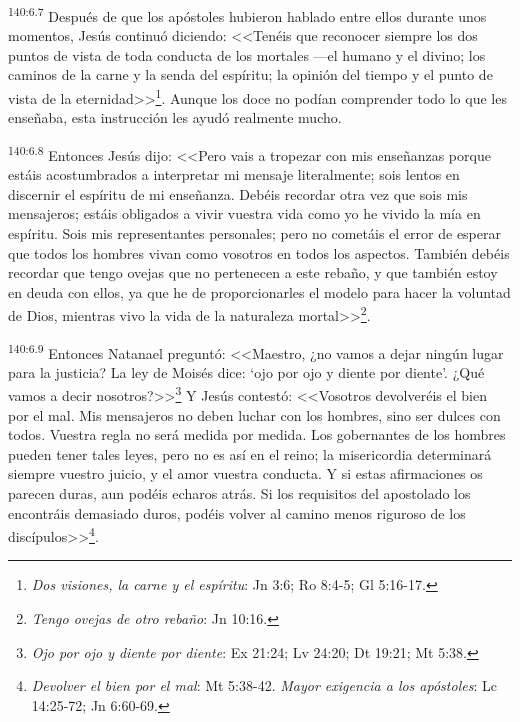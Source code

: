 \par 
\textsuperscript{140:6.7} Después de que los apóstoles hubieron hablado entre ellos durante unos momentos, Jesús continuó diciendo: <<Tenéis que reconocer siempre los dos puntos de vista de toda conducta de los mortales ---el humano y el divino; los caminos de la carne y la senda del espíritu; la opinión del tiempo y el punto de vista de la eternidad>>\footnote{\textit{Dos visiones, la carne y el espíritu}: Jn 3:6; Ro 8:4-5; Gl 5:16-17.}. Aunque los doce no podían comprender todo lo que les enseñaba, esta instrucción les ayudó realmente mucho.

\par 
\textsuperscript{140:6.8} Entonces Jesús dijo: <<Pero vais a tropezar con mis enseñanzas porque estáis acostumbrados a interpretar mi mensaje literalmente; sois lentos en discernir el espíritu de mi enseñanza. Debéis recordar otra vez que sois mis mensajeros; estáis obligados a vivir vuestra vida como yo he vivido la mía en espíritu. Sois mis representantes personales; pero no cometáis el error de esperar que todos los hombres vivan como vosotros en todos los aspectos. También debéis recordar que tengo ovejas que no pertenecen a este rebaño, y que también estoy en deuda con ellos, ya que he de proporcionarles el modelo para hacer la voluntad de Dios, mientras vivo la vida de la naturaleza mortal>>\footnote{\textit{Tengo ovejas de otro rebaño}: Jn 10:16.}.

\par 
\textsuperscript{140:6.9} Entonces Natanael preguntó: <<Maestro, ¿no vamos a dejar ningún lugar para la justicia? La ley de Moisés dice: `ojo por ojo y diente por diente'. ¿Qué vamos a decir nosotros?>>\footnote{\textit{Ojo por ojo y diente por diente}: Ex 21:24; Lv 24:20; Dt 19:21; Mt 5:38.} Y Jesús contestó: <<Vosotros devolveréis el bien por el mal. Mis mensajeros no deben luchar con los hombres, sino ser dulces con todos. Vuestra regla no será medida por medida. Los gobernantes de los hombres pueden tener tales leyes, pero no es así en el reino; la misericordia determinará siempre vuestro juicio, y el amor vuestra conducta. Y si estas afirmaciones os parecen duras, aun podéis echaros atrás. Si los requisitos del apostolado los encontráis demasiado duros, podéis volver al camino menos riguroso de los discípulos>>\footnote{\textit{Devolver el bien por el mal}: Mt 5:38-42. \textit{Mayor exigencia a los apóstoles}: Lc 14:25-72; Jn 6:60-69.}.

